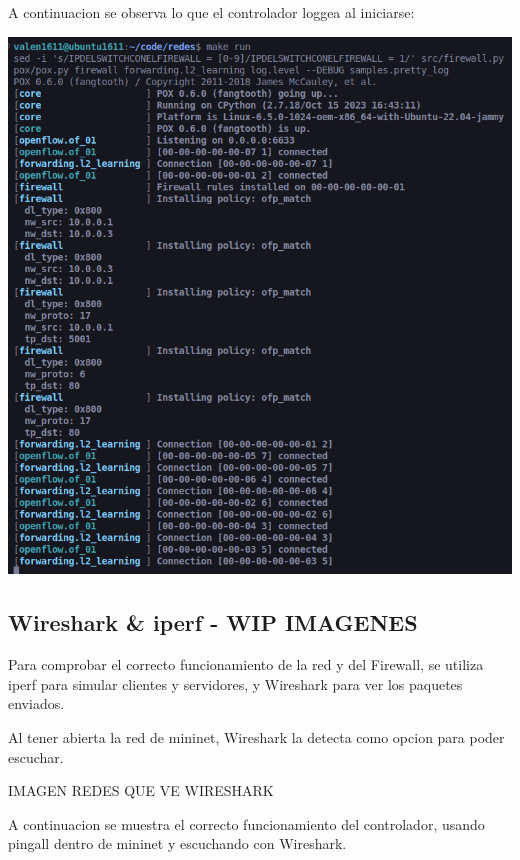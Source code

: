 \documentclass{article}
\begin{document}
A continuacion se observa lo que el controlador loggea al iniciarse:
\begin{center}
 \includegraphics[scale=0.45]{images/pox_init.png}
\end{center}

\subsection{Wireshark \& iperf - WIP IMAGENES}\label{stop-and-wait}

Para comprobar el correcto funcionamiento de la red y del Firewall, se utiliza iperf para
simular clientes y servidores, y Wireshark para ver los paquetes enviados.

Al tener abierta la red de mininet, Wireshark la detecta como opcion para poder escuchar.

IMAGEN REDES QUE VE WIRESHARK
\begin{center}
\end{center}

A continuacion se muestra el correcto funcionamiento del controlador, usando pingall dentro de mininet y escuchando con Wireshark.
\end{document}
